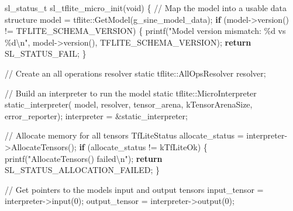 \documentclass[
  9pt,
  letterpaper,
  abstract,
  titlepage]{scrbook}
\newenvironment{Shaded}{\begin{snugshade}}{\end{snugshade}}
\newcommand{\CommentTok}[1]{\textcolor[rgb]{0.37,0.37,0.37}{#1}}
\newcommand{\ControlFlowTok}[1]{\textcolor[rgb]{0.00,0.23,0.31}{\textbf{#1}}}
\newcommand{\DataTypeTok}[1]{\textcolor[rgb]{0.68,0.00,0.00}{#1}}
\newcommand{\DecValTok}[1]{\textcolor[rgb]{0.68,0.00,0.00}{#1}}
\newcommand{\NormalTok}[1]{\textcolor[rgb]{0.00,0.23,0.31}{#1}}
\newcommand{\OperatorTok}[1]{\textcolor[rgb]{0.37,0.37,0.37}{#1}}
\newcommand{\SpecialCharTok}[1]{\textcolor[rgb]{0.37,0.37,0.37}{#1}}
\newcommand{\StringTok}[1]{\textcolor[rgb]{0.13,0.47,0.30}{#1}}
\begin{document}
\begin{Shaded}
\begin{Highlighting}[]
\NormalTok{sl\_status\_t sl\_tflite\_micro\_init}\OperatorTok{(}\DataTypeTok{void}\OperatorTok{)}
\OperatorTok{\{}
  \CommentTok{// Map the model into a usable data structure}
\NormalTok{  model }\OperatorTok{=}\NormalTok{ tflite}\OperatorTok{::}\NormalTok{GetModel}\OperatorTok{(}\NormalTok{g\_sine\_model\_data}\OperatorTok{);}
  \ControlFlowTok{if} \OperatorTok{(}\NormalTok{model}\OperatorTok{{-}\textgreater{}}\NormalTok{version}\OperatorTok{()} \OperatorTok{!=}\NormalTok{ TFLITE\_SCHEMA\_VERSION}\OperatorTok{)} \OperatorTok{\{}
\NormalTok{    printf}\OperatorTok{(}\StringTok{"Model version mismatch: }\SpecialCharTok{\%d}\StringTok{ vs }\SpecialCharTok{\%d\textbackslash{}n}\StringTok{"}\OperatorTok{,}\NormalTok{ model}\OperatorTok{{-}\textgreater{}}\NormalTok{version}\OperatorTok{(),}\NormalTok{ TFLITE\_SCHEMA\_VERSION}\OperatorTok{);}
    \ControlFlowTok{return}\NormalTok{ SL\_STATUS\_FAIL}\OperatorTok{;}
  \OperatorTok{\}}
  
  \CommentTok{// Create an all operations resolver}
  \DataTypeTok{static}\NormalTok{ tflite}\OperatorTok{::}\NormalTok{AllOpsResolver resolver}\OperatorTok{;}
  
  \CommentTok{// Build an interpreter to run the model}
  \DataTypeTok{static}\NormalTok{ tflite}\OperatorTok{::}\NormalTok{MicroInterpreter static\_interpreter}\OperatorTok{(}
\NormalTok{    model}\OperatorTok{,}\NormalTok{ resolver}\OperatorTok{,}\NormalTok{ tensor\_arena}\OperatorTok{,}\NormalTok{ kTensorArenaSize}\OperatorTok{,}\NormalTok{ error\_reporter}\OperatorTok{);}
\NormalTok{  interpreter }\OperatorTok{=} \OperatorTok{\&}\NormalTok{static\_interpreter}\OperatorTok{;}
  
  \CommentTok{// Allocate memory for all tensors}
\NormalTok{  TfLiteStatus allocate\_status }\OperatorTok{=}\NormalTok{ interpreter}\OperatorTok{{-}\textgreater{}}\NormalTok{AllocateTensors}\OperatorTok{();}
  \ControlFlowTok{if} \OperatorTok{(}\NormalTok{allocate\_status }\OperatorTok{!=}\NormalTok{ kTfLiteOk}\OperatorTok{)} \OperatorTok{\{}
\NormalTok{    printf}\OperatorTok{(}\StringTok{"AllocateTensors() failed}\SpecialCharTok{\textbackslash{}n}\StringTok{"}\OperatorTok{);}
    \ControlFlowTok{return}\NormalTok{ SL\_STATUS\_ALLOCATION\_FAILED}\OperatorTok{;}
  \OperatorTok{\}}
  
  \CommentTok{// Get pointers to the model\textquotesingle{}s input and output tensors}
\NormalTok{  input\_tensor }\OperatorTok{=}\NormalTok{ interpreter}\OperatorTok{{-}\textgreater{}}\NormalTok{input}\OperatorTok{(}\DecValTok{0}\OperatorTok{);}
\NormalTok{  output\_tensor }\OperatorTok{=}\NormalTok{ interpreter}\OperatorTok{{-}\textgreater{}}\NormalTok{output}\OperatorTok{(}\DecValTok{0}\OperatorTok{);}
  

\end{Highlighting}
\end{Shaded}
\end{document}
